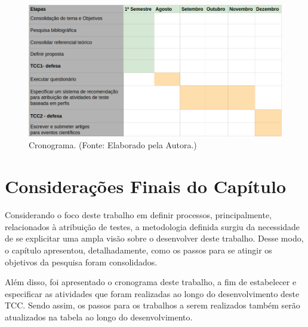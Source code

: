         \begin{figure}[H]
          \centering
          \includegraphics[width=15cm]{figuras/cronograma.png}
          \caption{Cronograma. (Fonte: Elaborado pela Autora.)}
          \label{fig:cronograma}

        \end{figure}

\section{Considerações Finais do Capítulo}

Considerando o foco deste trabalho em definir processos, principalmente, relacionados à atribuição de testes, a metodologia definida surgiu da necessidade de se explicitar uma ampla visão sobre o desenvolver deste trabalho. Desse modo, o capítulo apresentou, detalhadamente, como os passos para se atingir os objetivos da pesquisa foram consolidados.

Além disso, foi apresentado o cronograma deste trabalho, a fim de estabelecer e especificar as atividades que foram realizadas ao longo do desenvolvimento deste TCC. Sendo assim, os passos para os trabalhos a serem realizados também serão atualizados na tabela ao longo do desenvolvimento.
